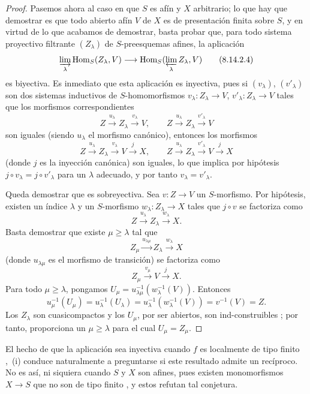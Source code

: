 \begin{proof}
Pasemos ahora al caso en que $S$ es afín y $X$ arbitrario; lo que hay que demostrar es que todo abierto afín $V$ de $X$ es de presentación finita sobre $S$, y en virtud de lo que acabamos de demostrar, basta probar que, para todo sistema proyectivo filtrante $(Z_\lambda)$ de $S$-preesquemas afines, la aplicación
\begin{equation}
\label{IV.8.14.2.4}
\varinjlim_\lambda\operatorname{Hom}_S(Z_\lambda,V)\to\operatorname{Hom}_S(\varprojlim_\lambda Z_\lambda,V) \tag{8.14.2.4}
\end{equation}
es biyectiva.
Es inmediato que esta aplicación es inyectiva, pues si $(v_\lambda)$, $(v'_\lambda)$ son dos sistemas inductivos de $S$-homomorfismos $v_\lambda:Z_\lambda\to V$, $v'_\lambda:Z_\lambda\to V$ tales que los morfismos correspondientes
\[
Z\xrightarrow{u_\lambda}Z_\lambda\xrightarrow{v_\lambda}V,\qquad
Z\xrightarrow{u_\lambda}Z_\lambda\xrightarrow{v'_\lambda}V
\]
son iguales (siendo $u_\lambda$ el morfismo canónico), entonces los morfismos
\[
Z\xrightarrow{u_\lambda}Z_\lambda\xrightarrow{v_\lambda}V\xrightarrow{j}X,\qquad Z\xrightarrow{u_\lambda}Z_\lambda\xrightarrow{v'_\lambda}V\xrightarrow{j}X
\]
(donde $j$ es la inyección canónica) son iguales, lo que implica por hipótesis $j\circ v_\lambda=j\circ v'_\lambda$ para un $\lambda$ adecuado, y por tanto $v_\lambda=v'_\lambda$.


Queda demostrar que  es sobreyectiva.
Sea $v:Z\to V$ un $S$-morfismo.
Por hipótesis, existen un índice $\lambda$ y un $S$-morfismo
$w_\lambda:Z_\lambda\to X$ tales que $j\circ v$ se factoriza como
\[
 Z\xrightarrow{u_\lambda}Z_\lambda\xrightarrow{w_\lambda}X.
\]
Basta demostrar que existe $\mu\geqslant\lambda$ tal que
\[
 Z_\mu\xrightarrow{u_{\lambda\mu}}Z_\lambda\xrightarrow{w_\lambda}X
\]
(donde $u_{\lambda\mu}$ es el morfismo de transición) se factoriza como
\[
 Z_\mu\xrightarrow{v_\mu}V\xrightarrow{j}X.
\]
Para todo $\mu\geqslant\lambda$, pongamos
$U_\mu=u_{\lambda\mu}^{-1}(w_\lambda^{-1}(V))$.
Entonces
\[
 u_\mu^{-1}(U_\mu)=u_\lambda^{-1}(U_\lambda)
 =u_\lambda^{-1}(w_\lambda^{-1}(V))
 =v^{-1}(V)=Z.
\]
Los $Z_\lambda$ son cuasicompactos y los $U_\mu$, por ser abiertos, son
ind-construibles ; por tanto,  proporciona un
$\mu\geqslant\lambda$ para el cual $U_\mu=Z_\mu$.
\end{proof}

\begin{remark}[8.14.3]
\label{IV.8.14.3}
El hecho de que la aplicación  sea inyectiva cuando $f$ es localmente de tipo
finito ,~(i) conduce naturalmente a preguntarse si este resultado admite un recíproco.
No es así, ni siquiera cuando $S$ y $X$ son afines, pues existen monomorfismos
$X\to S$ que no son de tipo finito , y estos refutan tal
conjetura.
\end{remark}
